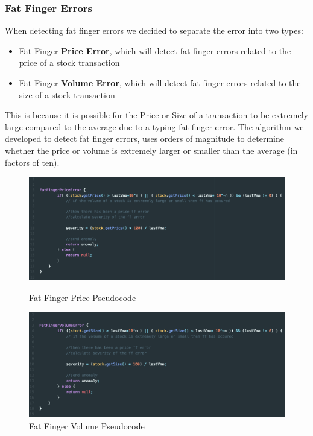 \documentclass[12pt]{article}
\begin{document}
    \subsubsection{Fat Finger Errors}
    When detecting fat finger errors we decided to separate the error into two types:
    \begin{itemize}
      \item Fat Finger \textbf{Price Error}, which will detect fat finger errors related to the price of a stock transaction
      \item Fat Finger \textbf{Volume Error}, which will detect fat finger errors related to the size of a stock transaction
    \end{itemize}
    This is because it is possible for the Price or Size of a transaction to be extremely large compared to the average due to a typing fat finger error.
    The algorithm we developed to detect fat finger errors, uses orders of magnitude to determine whether the price or volume is extremely larger or smaller than the average (in factors of ten).
    \begin{figure}[H]
      \centering
      \begin{minipage}[H]{0.9\textwidth}
        \includegraphics[width=\textwidth]{FFprice.png}
        \caption{Fat Finger Price Pseudocode}
      \end{minipage}
      \begin{minipage}[H]{0.9\textwidth}
        \includegraphics[width=\textwidth]{FFvolume.png}
        \caption{Fat Finger Volume Pseudocode}
      \end{minipage}
    \end{figure}
\end{document}

